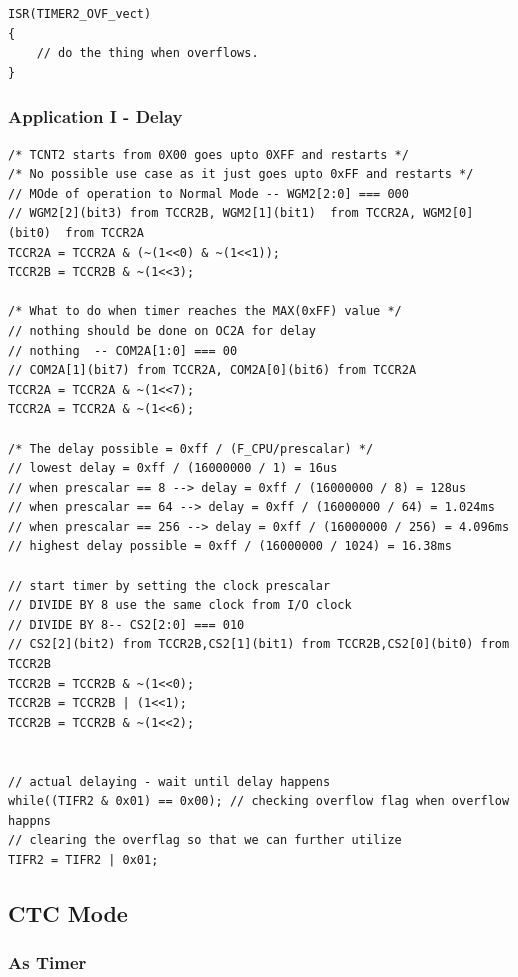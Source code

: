 \documentclass{article}
\begin{document}
\begin{verbatim}
ISR(TIMER2_OVF_vect)
{
    // do the thing when overflows.
}
\end{verbatim}



\subsubsection{Application I - Delay}
\begin{verbatim}
/* TCNT2 starts from 0X00 goes upto 0XFF and restarts */
/* No possible use case as it just goes upto 0xFF and restarts */
// MOde of operation to Normal Mode -- WGM2[2:0] === 000
// WGM2[2](bit3) from TCCR2B, WGM2[1](bit1)  from TCCR2A, WGM2[0](bit0)  from TCCR2A
TCCR2A = TCCR2A & (~(1<<0) & ~(1<<1));
TCCR2B = TCCR2B & ~(1<<3);

/* What to do when timer reaches the MAX(0xFF) value */
// nothing should be done on OC2A for delay
// nothing  -- COM2A[1:0] === 00
// COM2A[1](bit7) from TCCR2A, COM2A[0](bit6) from TCCR2A
TCCR2A = TCCR2A & ~(1<<7);
TCCR2A = TCCR2A & ~(1<<6);
    
/* The delay possible = 0xff / (F_CPU/prescalar) */
// lowest delay = 0xff / (16000000 / 1) = 16us
// when prescalar == 8 --> delay = 0xff / (16000000 / 8) = 128us
// when prescalar == 64 --> delay = 0xff / (16000000 / 64) = 1.024ms
// when prescalar == 256 --> delay = 0xff / (16000000 / 256) = 4.096ms
// highest delay possible = 0xff / (16000000 / 1024) = 16.38ms

// start timer by setting the clock prescalar
// DIVIDE BY 8 use the same clock from I/O clock
// DIVIDE BY 8-- CS2[2:0] === 010
// CS2[2](bit2) from TCCR2B,CS2[1](bit1) from TCCR2B,CS2[0](bit0) from TCCR2B
TCCR2B = TCCR2B & ~(1<<0);
TCCR2B = TCCR2B | (1<<1);
TCCR2B = TCCR2B & ~(1<<2);


// actual delaying - wait until delay happens
while((TIFR2 & 0x01) == 0x00); // checking overflow flag when overflow happns
// clearing the overflag so that we can further utilize
TIFR2 = TIFR2 | 0x01;
\end{verbatim}

\subsection{CTC Mode}
\subsubsection{As Timer}
\end{document}

